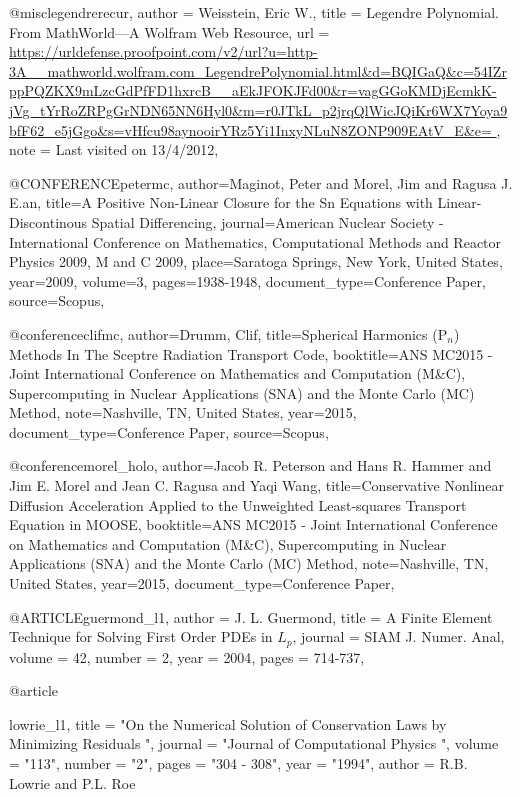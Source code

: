 @misc{legendrerecur,
	author   = {Weisstein, Eric W.},
	title    = {Legendre Polynomial. {From MathWorld---A Wolfram Web Resource}},
	url      = {\url{https://urldefense.proofpoint.com/v2/url?u=http-3A__mathworld.wolfram.com_LegendrePolynomial.html&d=BQIGaQ&c=54IZrppPQZKX9mLzcGdPfFD1hxrcB__aEkJFOKJFd00&r=vagGGoKMDjEcmkK-jVg_tYrRoZRPgGrNDN65NN6Hyl0&m=r0JTkL_p2jrqQlWicJQiKr6WX7Yoya9bfF62_e5jGgo&s=vHfcu98aynooirYRz5Yi1InxyNLuN8ZONP909EAtV_E&e= }},
	note     = {Last visited on 13/4/2012},
}


@CONFERENCE{petermc,
	author={Maginot, Peter and Morel, Jim and Ragusa J. E.an},
	title={A Positive Non-Linear Closure for the Sn Equations with Linear-Discontinous Spatial Differencing},
	journal={American Nuclear Society - International Conference on Mathematics, Computational Methods and Reactor Physics 2009, M and C 2009},
	place={Saratoga Springs, New York, United States},
	year={2009},
	volume={3},
	pages={1938-1948}, %
	document_type={Conference Paper},
	source={Scopus},
}

@conference{clifmc,
	author={Drumm, Clif},
	title={Spherical Harmonics ({P$_n$}) Methods In The Sceptre Radiation Transport Code},
	booktitle={ANS MC2015 - Joint International Conference on Mathematics and Computation (M\&C), Supercomputing in Nuclear Applications (SNA) and the Monte Carlo (MC) Method},
	note={Nashville, TN, United States},
	year={2015},
	document_type={Conference Paper},
	source={Scopus},
}

@conference{morel_holo,
	author={Jacob R. Peterson and Hans R. Hammer and Jim E. Morel and Jean C. Ragusa and Yaqi Wang},
	title={{Conservative Nonlinear Diffusion Acceleration Applied to the Unweighted Least-squares Transport Equation in MOOSE}},
	booktitle={ANS MC2015 - Joint International Conference on Mathematics and Computation (M\&C), Supercomputing in Nuclear Applications (SNA) and the Monte Carlo (MC) Method},
	note={Nashville, TN, United States},
	year={2015},
	document_type={Conference Paper},
}

@ARTICLE{guermond_l1,
	author = {J. L. Guermond},
	title = {A Finite Element Technique for Solving First Order PDEs in ${L}_p$},
	journal = {SIAM J. Numer. Anal},
	volume = {42},
	number = {2},
	year = {2004},
	pages = {714-737},
}

@article{lowrie_l1,
	title = "On the Numerical Solution of Conservation Laws by Minimizing Residuals ",
	journal = "Journal of Computational Physics ",
	volume = "113",
	number = "2",
	pages = "304 - 308",
	year = "1994",
	author = {R.B. Lowrie and P.L. Roe}
	
}

